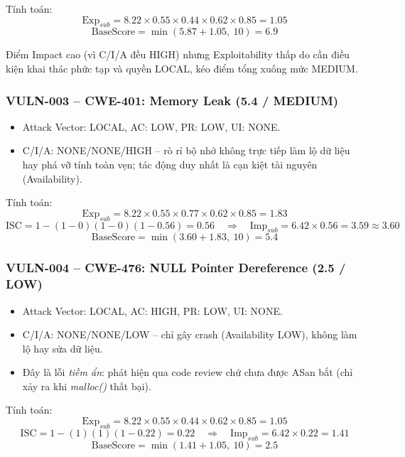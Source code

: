 Tính toán:
\[
\mathrm{Exp}_{sub} = 8.22 \times 0.55 \times 0.44 \times 0.62 \times 0.85 = 1.05
\]
\[
\mathrm{BaseScore} = \min(5.87 + 1.05,\ 10) = 6.9
\]

Điểm Impact cao (vì C/I/A đều HIGH) nhưng Exploitability thấp do cần điều kiện
khai thác phức tạp và quyền LOCAL, kéo điểm tổng xuống mức MEDIUM.

\subsubsection{VULN-003 -- CWE-401: Memory Leak (5.4 / MEDIUM)}

\begin{itemize}
    \item Attack Vector: LOCAL, AC: LOW, PR: LOW, UI: NONE.
    \item C/I/A: NONE/NONE/HIGH -- rò rỉ bộ nhớ không trực tiếp làm
          lộ dữ liệu hay phá vỡ tính toàn vẹn; tác động duy nhất là cạn kiệt
          tài nguyên (Availability).
\end{itemize}

Tính toán:
\[
\mathrm{Exp}_{sub} = 8.22 \times 0.55 \times 0.77 \times 0.62 \times 0.85 = 1.83
\]
\[
\mathrm{ISC} = 1 - (1-0)(1-0)(1-0.56) = 0.56 \quad \Rightarrow \quad
\mathrm{Imp}_{sub} = 6.42 \times 0.56 = 3.59 \approx 3.60
\]
\[
\mathrm{BaseScore} = \min(3.60 + 1.83,\ 10) = 5.4
\]

\subsubsection{VULN-004 -- CWE-476: NULL Pointer Dereference (2.5 / LOW)}

\begin{itemize}
    \item Attack Vector: LOCAL, AC: HIGH, PR: LOW, UI: NONE.
    \item C/I/A: NONE/NONE/LOW -- chỉ gây crash (Availability LOW),
          không làm lộ hay sửa dữ liệu.
    \item Đây là lỗi \emph{tiềm ẩn}: phát hiện qua code review chứ chưa được
          ASan bắt (chỉ xảy ra khi \textit{malloc()} thất bại).
\end{itemize}

Tính toán:
\[
\mathrm{Exp}_{sub} = 8.22 \times 0.55 \times 0.44 \times 0.62 \times 0.85 = 1.05
\]
\[
\mathrm{ISC} = 1 - (1)(1)(1-0.22) = 0.22 \quad \Rightarrow \quad
\mathrm{Imp}_{sub} = 6.42 \times 0.22 = 1.41
\]
\[
\mathrm{BaseScore} = \min(1.41 + 1.05,\ 10) = 2.5
\]

